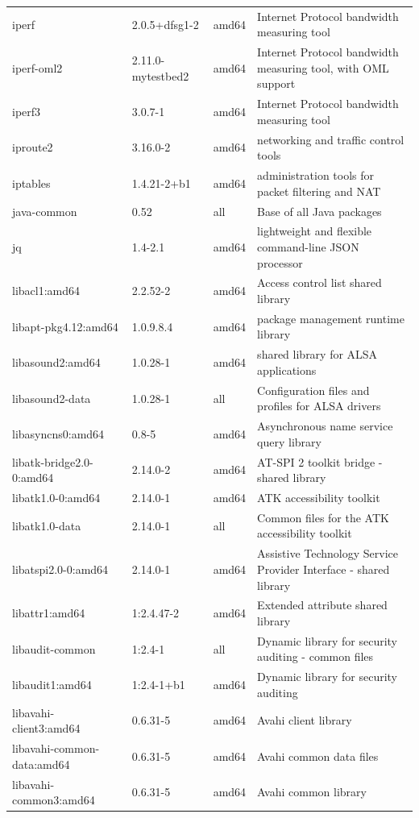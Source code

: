 \documentclass[a4paper,10pt]{article}
\begin{document}
\begin{appendices}
{\begin{longtable}{p{3.25cm}@{\hspace{0.25cm}}p{4cm}@{\hspace{0.25cm}}l@{\hspace{0.25cm}}p{7cm}}
iperf	&	2.0.5+dfsg1-2	&	amd64	&	Internet Protocol bandwidth measuring tool	\\
iperf-oml2	&	2.11.0-mytestbed2	&	amd64	&	Internet Protocol bandwidth measuring tool, with OML support	\\
iperf3	&	3.0.7-1	&	amd64	&	Internet Protocol bandwidth measuring tool	\\
iproute2	&	3.16.0-2	&	amd64	&	networking and traffic control tools	\\
iptables	&	1.4.21-2+b1	&	amd64	&	administration tools for packet filtering and NAT	\\
java-common	&	0.52	&	all	&	Base of all Java packages	\\
jq	&	1.4-2.1	&	amd64	&	lightweight and flexible command-line JSON processor	\\
libacl1:amd64	&	2.2.52-2	&	amd64	&	Access control list shared library	\\
libapt-pkg4.12:amd64	&	1.0.9.8.4	&	amd64	&	package management runtime library	\\
libasound2:amd64	&	1.0.28-1	&	amd64	&	shared library for ALSA applications	\\
libasound2-data	&	1.0.28-1	&	all	&	Configuration files and profiles for ALSA drivers	\\
libasyncns0:amd64	&	0.8-5	&	amd64	&	Asynchronous name service query library	\\
libatk-bridge2.0-0:amd64	&	2.14.0-2	&	amd64	&	AT-SPI 2 toolkit bridge - shared library	\\
libatk1.0-0:amd64	&	2.14.0-1	&	amd64	&	ATK accessibility toolkit	\\
libatk1.0-data	&	2.14.0-1	&	all	&	Common files for the ATK accessibility toolkit	\\
libatspi2.0-0:amd64	&	2.14.0-1	&	amd64	&	Assistive Technology Service Provider Interface - shared library	\\
libattr1:amd64	&	1:2.4.47-2	&	amd64	&	Extended attribute shared library	\\
libaudit-common	&	1:2.4-1	&	all	&	Dynamic library for security auditing - common files	\\
libaudit1:amd64	&	1:2.4-1+b1	&	amd64	&	Dynamic library for security auditing	\\
libavahi-client3:amd64	&	0.6.31-5	&	amd64	&	Avahi client library	\\
libavahi-common-data:amd64	&	0.6.31-5	&	amd64	&	Avahi common data files	\\
libavahi-common3:amd64	&	0.6.31-5	&	amd64	&	Avahi common library	\\

\end{longtable}}
\end{appendices}
\end{document}
